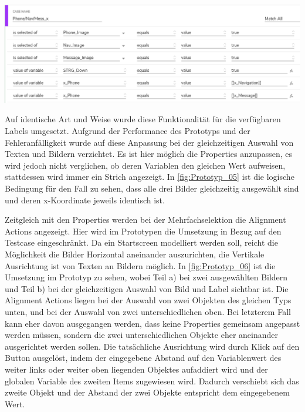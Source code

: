 \begin{center}
  \includegraphics[scale=0.5]{figures/Prototyp_05.PNG}
  \label{fig:Prototyp_05}
\end{center}

Auf identische Art und Weise wurde diese Funktionalität für die verfügbaren Labels umgesetzt.
Aufgrund der Performance des Prototyps und der Fehleranfälligkeit wurde auf diese Anpassung bei der gleichzeitigen Auswahl von Texten und Bildern verzichtet.
Es ist hier möglich die Properties anzupassen, es wird jedoch nicht verglichen, ob deren Variablen den gleichen Wert aufweisen, stattdessen wird immer ein Strich angezeigt.
In \cref{fig:Prototyp_05} ist die logische Bedingung für den Fall zu sehen, dass alle drei Bilder gleichzeitig ausgewählt sind und deren x-Koordinate jeweils identisch ist.

Zeitgleich mit den Properties werden bei der Mehrfachselektion die Alignment Actions angezeigt.
Hier wird im Prototypen die Umsetzung in Bezug auf den Testcase eingeschränkt.
Da ein Startscreen modelliert werden soll, reicht die Möglichkeit die Bilder Horizontal aneinander auszurichten, die Vertikale Ausrichtung ist von Texten an Bildern möglich.
In \cref{fig:Prototyp_06} ist die Umsetzung im Prototyp zu sehen, wobei Teil a) bei zwei ausgewählten Bildern und Teil b) bei der gleichzeitigen Auswahl von Bild und Label sichtbar ist.
Die Alignment Actions liegen bei der Auswahl von zwei Objekten des gleichen Typs unten, und bei der Auswahl von zwei unterschiedlichen oben.
Bei letzterem Fall kann eher davon ausgegangen werden, dass keine Properties gemeinsam angepasst werden müssen, sondern die zwei unterschiedlichen Objekte eher aneinander ausgerichtet werden sollen.
Die tatsächliche Ausrichtung wird durch Klick auf den Button ausgelöst, indem der eingegebene Abstand auf den Variablenwert des weiter links oder weiter oben liegenden Objektes aufaddiert wird und der globalen Variable des zweiten Items zugewiesen wird.
Dadurch verschiebt sich das zweite Objekt und der Abstand der zwei Objekte entspricht dem eingegebenem Wert.

